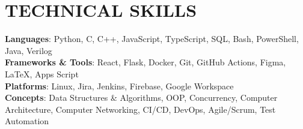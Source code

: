 \section{\textbf {\large TECHNICAL SKILLS}}
    \begin{itemize}[leftmargin=0.15in, label={}]
	\small{\item{
		\textbf{Languages}{: Python, C, C++, JavaScript, TypeScript, SQL, Bash, PowerShell, Java, Verilog} \\
		\textbf{Frameworks \& Tools}{: React, Flask, Docker, Git, GitHub Actions, Figma, LaTeX, Apps Script} \\
		\textbf{Platforms}{: Linux, Jira, Jenkins, Firebase, Google Workspace} \\
		\textbf{Concepts}{: Data Structures \& Algorithms, OOP, Concurrency, Computer Architecture, Computer Networking, CI/CD, DevOps, Agile/Scrum, Test Automation}
	}}
    \end{itemize}
